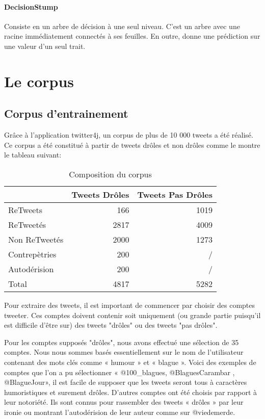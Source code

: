 \documentclass[10pt,a4paper,twoside]{article}
\begin{document}
\paragraph{DecisionStump} Consiste en un arbre de décision à une seul niveau. C'est un arbre avec une racine immédiatement connectés à ses feuilles. En outre, donne une prédiction sur une valeur d'un seul trait.




\section{Le corpus}

\subsection{Corpus d'entrainement}
Grâce à l'application twitter4j, un corpus de plus de 10 000 tweets a été réalisé. Ce corpus a été constitué à partir de tweets drôles et non drôles comme le montre le tableau suivant: 

\begin{table}[!h]
\centering
	\begin{tabular}{lrr}
	\toprule
	& Tweets Drôles & Tweets Pas Drôles \\
	\midrule
	 ReTweets & 166 & 1019 \\
	
	 ReTweetés & 2817 & 4009 \\
	
	Non ReTweetés & 2000 & 1273 \\
	
	Contrepètries & 200 & / \\
	Autodérision & 200 & / \\
	 \midrule
	Total & 4817 & 5282 \\
	\bottomrule
	\end{tabular}
\caption{Composition du corpus}
\end{table}


Pour extraire des tweets, il est important de commencer par choisir des comptes tweeter. Ces comptes doivent contenir soit uniquement (ou grande partie puisqu'il est difficile d'être sur) des tweets "drôles" ou des tweets "pas drôles".

Pour les comptes supposés "drôles", nous avons effectué une sélection de 35 comptes. Nous nous sommes basés essentiellement sur le nom de l'utilisateur contenant des mots clés comme « humour » et « blague ». Voici des exemples de comptes que l'on a pu sélectionner « @100\_blagues, @BlaguesCarambar , @BlagueJour», il est facile de supposer que les tweets seront tous à caractères humoristiques et surement drôles. D'autres comptes ont été choisis par rapport à leur notoriété. Ils sont connus pour rassembler des tweets « drôles » par leur ironie ou montrant l'autodérision de leur auteur comme sur @viedemerde.
\end{document}
